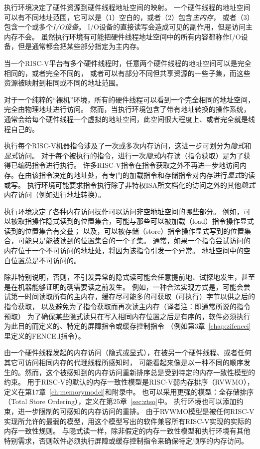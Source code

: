 执行环境决定了硬件资源到硬件线程地址空间的映射。
一个硬件线程的地址空间可以有不同地址范围，它可以是（1）空白的，或者（2）包含{\em 主内存}，
或者（3）包含一个或多个{\em I/O设备}。
I/O设备的直接读写会造成可见的副作用，但是访问主内存不会。
虽然执行环境有可能把硬件线程地址空间中的所有内容都称作I/O设备，但是通常都会把某些部分指定为主内存。

当一个RISC-V平台有多个硬件线程时，任意两个硬件线程的地址空间可以是完全相同的，或者完全不同的，
或者可以有部分不同但共享资源的一些子集，而这些资源被映射到相同或不同的地址范围。

\begin{commentary}

  对于一个纯粹的“裸机”环境，所有的硬件线程可以看到一个完全相同的地址空间，完全由物理地址进行访问。
  然而，当执行环境包含了带有地址转换的操作系统，通常会给每个硬件线程一个虚拟的地址空间，此空间很大程度上、或者完全就是线程自己的。
\end{commentary}

执行每个RISC-V机器指令涉及了一次或多次内存访问，这进一步可划分为{\em 隐式}和{\em 显式}访问。
对于每个被执行的指令，进行一次{\em 隐式}内存读（指令获取）是为了获得已编码指令进行执行。
许多RISC-V指令在指令获取之外不再进一步地访问内存。在由该指令决定的地址处，有专门的加载指令和存储指令对内存进行{\em 显式}的读或写。
执行环境可能要求指令执行除了非特权ISA所文档化的访问之外的其他{\em 隐式}内存访问（例如进行地址转换）。

执行环境决定了各种内存访问操作可以访问非空地址空间的哪些部分。
例如，可以被取指操作隐式读到的位置集合，可能与那些可以被加载（load）指令操作显式读到的位置集合有交叠；
以及，可以被存储（store）指令操作显式写到的位置集合，可能只是能被读到的位置集合的一个子集。
通常，如果一个指令尝试访问的内存位于一个不可访问的地址处，将因为该指令引发一个异常。
地址空间中的空白位置总是不可访问的。

除非特别说明，否则，不引发异常的隐式读可能会任意提前地、试探地发生，甚至是在机器能够证明的确需要读之前发生。
例如，一种合法实现方式是，可能会尝试第一时间读取所有的主内存，缓存尽可能多的可获取（可执行）字节以供之后的指令获取，
以及避免为了指令获取而再次读主内存（译者注：即通常所说的指令预取）
为了确保某些隐式读只在写入相同内存位置之后是有序的，软件必须执行为此目的而定义的、特定的屏障指令或缓存控制指令
（例如第3章~\ref{chap:zifencei}里定义的FENCE.I指令）。

由一个硬件线程发起的内存访问（隐式或显式），在被另一个硬件线程、或者任何其它可访问相同内存的代理线程所感知时，
可能看起来像是以一种不同的顺序发生的。然而，这个被感知到的内存访问重新排序总是受到特定的内存一致性模型的约束。
用于RISC-V的默认的内存一致性模型是RISC-V弱内存排序（RVWMO），定义在第17章~\ref{ch:memorymodel}和附录中。
也可以采用更强的模型：全存储排序（Total Store Ordering），定义在第25章~\ref{sec:ztso}中。
执行环境也可以添加约束，进一步限制的可感知的内存访问的重排。
由于RVWMO模型是被任何RISC-V实现所允许的最弱的模型，用这个模型写出的软件兼容所有RISC-V实现的实际的内存一致性规则。
与隐式读一样，除非假定的内存一致性模型和执行环境有其他特别需求，否则软件必须执行屏障或缓存控制指令来确保特定顺序的内存访问。

